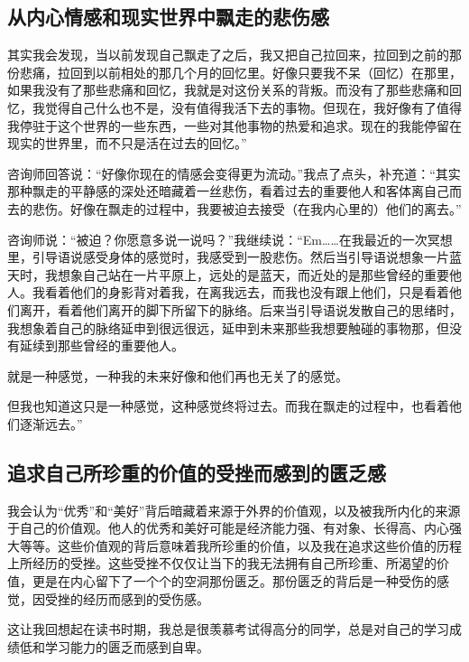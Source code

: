

\subsection*{从内心情感和现实世界中飘走的悲伤感}

其实我会发现，当以前发现自己飘走了之后，我又把自己拉回来，拉回到之前的那份悲痛，拉回到以前相处的那几个月的回忆里。好像只要我不呆（回忆）在那里，如果我没有了那些悲痛和回忆，我就是对这份关系的背叛。而没有了那些悲痛和回忆，我觉得自己什么也不是，没有值得我活下去的事物。但现在，我好像有了值得我停驻于这个世界的一些东西，一些对其他事物的热爱和追求。现在的我能停留在现实的世界里，而不只是活在过去的回忆。”

咨询师回答说：“好像你现在的情感会变得更为流动。”我点了点头，补充道：“其实那种飘走的平静感的深处还暗藏着一丝悲伤，看着过去的重要他人和客体离自己而去的悲伤。好像在飘走的过程中，我要被迫去接受（在我内心里的）他们的离去。”

咨询师说：“被迫？你愿意多说一说吗？”我继续说：“Em……在我最近的一次冥想里，引导语说感受身体的感觉时，我感受到一股悲伤。然后当引导语说想象一片蓝天时，我想象自己站在一片平原上，远处的是蓝天，而近处的是那些曾经的重要他人。我看着他们的身影背对着我，在离我远去，而我也没有跟上他们，只是看着他们离开，看着他们离开的脚下所留下的脉络。后来当引导语说发散自己的思绪时，我想象着自己的脉络延申到很远很远，延申到未来那些我想要触碰的事物那，但没有延续到那些曾经的重要他人。

就是一种感觉，一种我的未来好像和他们再也无关了的感觉。

但我也知道这只是一种感觉，这种感觉终将过去。而我在飘走的过程中，也看着他们逐渐远去。”



\subsection*{追求自己所珍重的价值的受挫而感到的匮乏感}

我会认为“优秀”和“美好”背后暗藏着来源于外界的价值观，以及被我所内化的来源于自己的价值观。他人的优秀和美好可能是经济能力强、有对象、长得高、内心强大等等。这些价值观的背后意味着我所珍重的价值，以及我在追求这些价值的历程上所经历的受挫。这些受挫不仅仅让当下的我无法拥有自己所珍重、所渴望的价值，更是在内心留下了一个个的空洞\pozhehao{}那份匮乏。那份匮乏的背后是一种受伤的感觉，因受挫的经历而感到的受伤感。

这让我回想起在读书时期，我总是很羡慕考试得高分的同学，总是对自己的学习成绩低和学习能力的匮乏而感到自卑。

